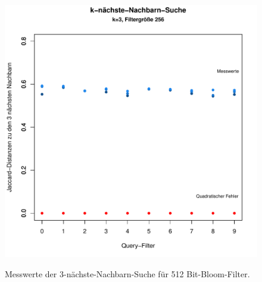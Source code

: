 \begin{figure}
	\includegraphics[scale=0.7]{pictures/nn3_256-2.pdf}\\
	\caption[Messwerte der 3-nächste-Nachbarn-Suche für 512 Bit-Bloom-Filter]{Messwerte der 3-nächste-Nachbarn-Suche für 512 Bit-Bloom-Filter.}\label{fig:pic10}
\end{figure}
